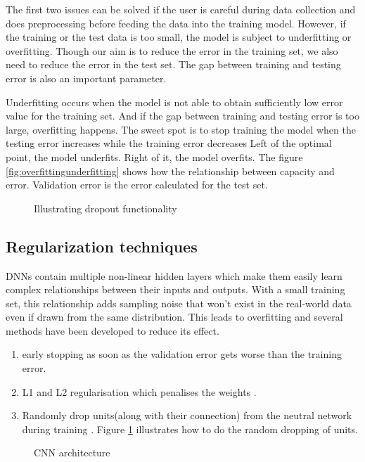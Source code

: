 The first two issues can be solved if the user is careful during data collection and does
preprocessing before feeding the data into the training model. However, if the training or
the test data is too small, the model is subject to underfitting or overfitting. Though
our aim is to reduce the error in the training set, we also need to reduce the error in
the test set. The gap between training and testing error is also an important parameter.

Underfitting occurs when the model is not able to obtain sufficiently low error value for
the training set. And if the gap between training and testing error is too large,
overfitting happens. The sweet spot is to stop training the model when the testing error
increases while the training error  decreases
 \label{inside:formodelcheckpoint} Left of the optimal point, the model underfits. Right of
it, the model overfits. The figure \ref{fig:overfittingunderfitting} shows how the
relationship between capacity and error. Validation error is the error calculated for the test set.

\begin{figure}[h]
	\centering
    \def\svgwidth{0.6\textwidth}
    
    \caption{Illustrating dropout functionality}
    \label{fig:Dropout_function}
\end{figure}

\subsection{Regularization techniques}
DNNs contain multiple non-linear hidden layers which make them easily learn
complex relationships between their inputs and outputs. With a small training set, this
relationship adds sampling noise that won't exist in the real-world data even if drawn
from the same distribution. This leads to overfitting and several methods have been
developed to reduce its effect.
\begin{enumerate}
    \item early stopping as soon as the validation error gets worse than the training
        error. \label{item:earlystopping}
    \item L1 and L2 regularisation which penalises the weights \cite{Schmidhuber_2015}.
    \item Randomly drop units(along with their connection) from the neutral network during
        training \cite{dropoutpaper}. Figure \ref{fig:Dropout_function} illustrates how to
        do the random dropping of units.
\end{enumerate}
\begin{figure}[h]
    \centering
    \def\svgwidth{\textwidth}
    
    \caption{CNN architecture}
    \label{fig:cnnarchitecture}
\end{figure}

